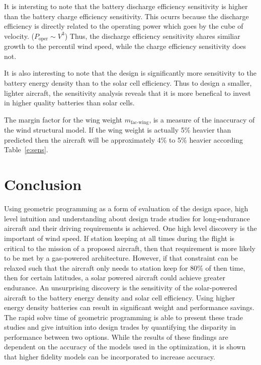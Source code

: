 \documentclass[]{aiaa-tc}%
\begin{document}
It is intersting to note that the battery discharge efficiency sensitivity is higher than the battery charge efficiency sensitivity.
This ocurrs because the discharge efficiency is directly related to the operating power which goes by the cube of velocity. ($P_{\text{oper}}\sim V^3$)
Thus, the discharge efficiency sensitivity shares similiar growth to the percentil wind speed, while the charge efficiency sensitivity does not. 

It is also interesting to note that the design is significantly more sensitivity to the battery energy density than to the solar cell efficiency.  
Thus to design a smaller, lighter aircraft, the sensitivity analysis reveals that it is more benefical to invest in higher quality batteries than solar cells. 

The margin factor for the wing weight $m_{\text{fac-wing}}$, is a measure of the inaccuracy of the wind structural model.  
If the wing weight is actually 5\% heavier than predicted then the aircraft will be approximately 4\% to 5\% heavier according Table~\ref{e:sens}.



\section{Conclusion}

Using geometric programming as a form of evaluation of the design space, high level intuition and understanding about design trade studies for long-endurance aircraft and their driving requirements is achieved.  
One high level discovery is the important of wind speed.  
If station keeping at all times during the flight is critical to the mission of a proposed aircraft, then that requirement is more likely to be met by a gas-powered architecture.
However, if that constraint can be relaxed such that the aircraft only needs to station keep for 80\% of then time, then for certain latitudes, a solar powered aircraft could achieve greater endurance.
An unsurprising discovery is the sensitivity of the solar-powered aircraft to the battery energy density and solar cell efficiency.  Using higher energy density batteries can result in significant weight and performance savings.  
The rapid solve time of geometric programming is able to present these trade studies and give intuition into design trades by quantifying the disparity in performance between two options.
While the results of these findings are dependent on the accuracy of the models used in the optimization, it is shown that higher fidelity models can be incorporated to increase accuracy.
\end{document}
